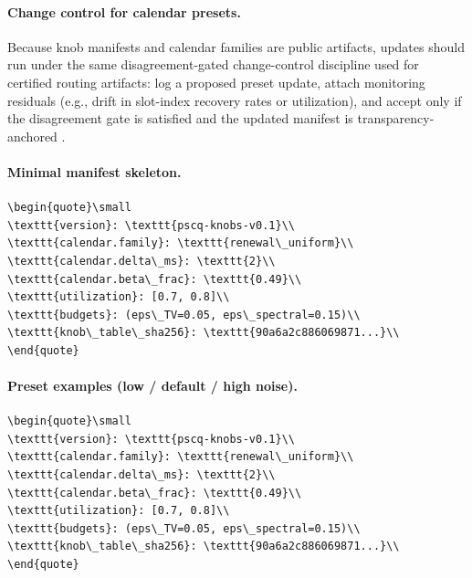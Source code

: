 \documentclass[11pt]{article}
\theoremstyle{definition}
\theoremstyle{remark}
\begin{document}
\paragraph{Change control for calendar presets.}
Because knob manifests and calendar families are public artifacts, updates should run under the same disagreement-gated change-control discipline used for certified routing artifacts: log a proposed preset update, attach monitoring residuals (e.g., drift in slot-index recovery rates or utilization), and accept only if the disagreement gate is satisfied and the updated manifest is transparency-anchored \cite{series:recert,anondht_release_receipts}.

\paragraph{Minimal manifest skeleton.}
\begin{lstlisting}[basicstyle=\ttfamily\small]
\begin{quote}\small
\texttt{version}: \texttt{pscq-knobs-v0.1}\\
\texttt{calendar.family}: \texttt{renewal\_uniform}\\
\texttt{calendar.delta\_ms}: \texttt{2}\\
\texttt{calendar.beta\_frac}: \texttt{0.49}\\
\texttt{utilization}: [0.7, 0.8]\\
\texttt{budgets}: (eps\_TV=0.05, eps\_spectral=0.15)\\
\texttt{knob\_table\_sha256}: \texttt{90a6a2c886069871...}\\
\end{quote}
\end{lstlisting}

\paragraph{Preset examples (low / default / high noise).}
\begin{lstlisting}[basicstyle=\ttfamily\small]
\begin{quote}\small
\texttt{version}: \texttt{pscq-knobs-v0.1}\\
\texttt{calendar.family}: \texttt{renewal\_uniform}\\
\texttt{calendar.delta\_ms}: \texttt{2}\\
\texttt{calendar.beta\_frac}: \texttt{0.49}\\
\texttt{utilization}: [0.7, 0.8]\\
\texttt{budgets}: (eps\_TV=0.05, eps\_spectral=0.15)\\
\texttt{knob\_table\_sha256}: \texttt{90a6a2c886069871...}\\
\end{quote}
\end{lstlisting}
\end{document}
